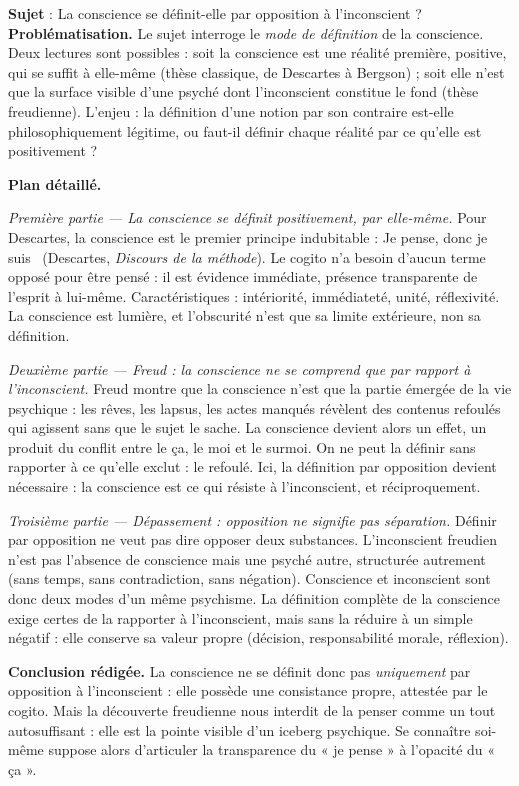 \documentclass[11pt]{article}
\newcommand{\cle}[1]{{\popxbold\color{popdark}#1}}
\begin{document}
\begin{exoresolu}
\textbf{Sujet} : La conscience se définit-elle par opposition à l'inconscient ?
\tcblower
\textbf{Problématisation.} Le sujet interroge le \emph{mode de définition} de la conscience. Deux lectures sont possibles : soit la conscience est une réalité première, positive, qui se suffit à elle-même (thèse classique, de Descartes à Bergson) ; soit elle n'est que la surface visible d'une psyché dont l'inconscient constitue le fond (thèse freudienne). L'enjeu : la définition d'une notion par son contraire est-elle philosophiquement légitime, ou faut-il définir chaque réalité par ce qu'elle est positivement ?

\textbf{Plan détaillé.}

\emph{Première partie — La conscience se définit positivement, par elle-même.} Pour Descartes, la conscience est le premier principe indubitable : \guillemotleft Je pense, donc je suis \guillemotright\ (Descartes, \emph{Discours de la méthode}). Le \cle{cogito} n'a besoin d'aucun terme opposé pour être pensé : il est évidence immédiate, présence transparente de l'esprit à lui-même. Caractéristiques : intériorité, immédiateté, unité, réflexivité. La conscience est lumière, et l'obscurité n'est que sa limite extérieure, non sa définition.

\emph{Deuxième partie — Freud : la conscience ne se comprend que par rapport à l'inconscient.} Freud montre que la conscience n'est que la partie émergée de la vie psychique : les rêves, les lapsus, les actes manqués révèlent des contenus \cle{refoulés} qui agissent sans que le sujet le sache. La conscience devient alors un effet, un produit du conflit entre le \cle{ça}, le \cle{moi} et le \cle{surmoi}. On ne peut la définir sans rapporter à ce qu'elle exclut : le refoulé. Ici, la définition par opposition devient nécessaire : la conscience est ce qui résiste à l'inconscient, et réciproquement.

\emph{Troisième partie — Dépassement : opposition ne signifie pas séparation.} Définir par opposition ne veut pas dire opposer deux substances. L'inconscient freudien n'est pas l'absence de conscience mais une psyché autre, structurée autrement (sans temps, sans contradiction, sans négation). Conscience et inconscient sont donc deux modes d'un même psychisme. La définition complète de la conscience exige certes de la rapporter à l'inconscient, mais sans la réduire à un simple négatif : elle conserve sa valeur propre (décision, responsabilité morale, réflexion).

\textbf{Conclusion rédigée.} La conscience ne se définit donc pas \emph{uniquement} par opposition à l'inconscient : elle possède une consistance propre, attestée par le cogito. Mais la découverte freudienne nous interdit de la penser comme un tout autosuffisant : elle est la pointe visible d'un iceberg psychique. Se connaître soi-même suppose alors d'articuler la transparence du « je pense » à l'opacité du « ça ».
\end{exoresolu}
\end{document}
